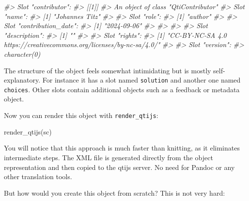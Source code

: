 \documentclass[twoside]{tufte-book}
\newenvironment{Shaded}{}{}
\newcommand{\CommentTok}[1]{\textcolor[rgb]{0.38,0.63,0.69}{\textit{#1}}}
\newcommand{\FunctionTok}[1]{\textcolor[rgb]{0.02,0.16,0.49}{#1}}
\newcommand{\NormalTok}[1]{#1}
\begin{document}
\begin{Shaded}
\begin{Highlighting}[]
\CommentTok{\#\textgreater{} Slot "contributor":}
\CommentTok{\#\textgreater{} [[1]]}
\CommentTok{\#\textgreater{} An object of class "QtiContributor"}
\CommentTok{\#\textgreater{} Slot "name":}
\CommentTok{\#\textgreater{} [1] "Johannes Titz"}
\CommentTok{\#\textgreater{} }
\CommentTok{\#\textgreater{} Slot "role":}
\CommentTok{\#\textgreater{} [1] "author"}
\CommentTok{\#\textgreater{} }
\CommentTok{\#\textgreater{} Slot "contribution\_date":}
\CommentTok{\#\textgreater{} [1] "2024{-}09{-}06"}
\CommentTok{\#\textgreater{} }
\CommentTok{\#\textgreater{} }
\CommentTok{\#\textgreater{} }
\CommentTok{\#\textgreater{} Slot "description":}
\CommentTok{\#\textgreater{} [1] ""}
\CommentTok{\#\textgreater{} }
\CommentTok{\#\textgreater{} Slot "rights":}
\CommentTok{\#\textgreater{} [1] "CC{-}BY{-}NC{-}SA 4.0 https://creativecommons.org/licenses/by{-}nc{-}sa/4.0/"}
\CommentTok{\#\textgreater{} }
\CommentTok{\#\textgreater{} Slot "version":}
\CommentTok{\#\textgreater{} character(0)}
\end{Highlighting}
\end{Shaded}

The structure of the object feels somewhat intimidating but is mostly self-explanatory. For instance it has a slot named \texttt{solution} and another one named \texttt{choices}. Other slots contain additional objects such as a feedback or metadata object.

Now you can render this object with \texttt{render\_qtijs}:

\begin{Shaded}
\begin{Highlighting}[]
\FunctionTok{render\_qtijs}\NormalTok{(sc)}
\end{Highlighting}
\end{Shaded}

You will notice that this approach is much faster than knitting, as it eliminates intermediate steps. The XML file is generated directly from the object representation and then copied to the qtijs server. No need for Pandoc or any other translation tools.

But how would you create this object from scratch? This is not very hard:
\end{document}
